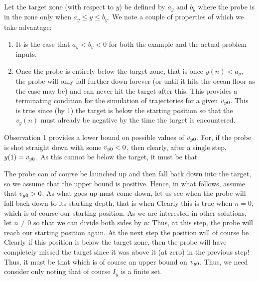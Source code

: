 \documentclass{article}
\begin{document}
{    Let the target zone (with respect to $y$) be defined by $a_y$ and $b_y$ where the probe is in the zone only when $a_y \leq y \leq b_y$.
    We note a couple of properties of which we take advantage:
    \begin{enumerate}
        \item It is the case that $a_y < b_y < 0$ for both the example and the actual problem inputs.
        \item Once the probe is entirely below the target zone, that is once $y(n) < a_y$, the probe will only fall further down forever (or until it hits the ocean floor as the case may be) and can never hit the target after this.
              This provides a terminating condition for the simulation of trajectories for a given $v_{y0}$.
              This is true since (by 1) the target is below the starting position so that the $v_y(n)$ must already be negative by the time the target is encountered.
    \end{enumerate}
    Observation 1 provides a lower bound on possible values of $v_{y0}$.
    For, if the probe is shot straight down with some $v_{y0} < 0$, then clearly, after a single step, $y(1) = v_{y0}$.
    As this cannot be below the target, it must be that

    The probe can of course be launched up and then fall back down into the target, so we assume that the upper bound is positive.
    Hence, in what follows, assume that $v_{y0} > 0$.
    As what goes up must come down, let us see when the probe will fall back down to its starting depth, that is when
    Clearly this is true when $n = 0$, which is of course our starting position.
    As we are interested in other solutions, let $n \neq 0$ so that we can divide both sides by $n$:
    Thus, at this step, the probe will reach our starting position again.
    At the next step the position will of course be
    Clearly if this position is below the target zone, then the probe will have completely missed the target since it was above it (at zero) in the previous step!
    Thus, it must be that
    which is of course an upper bound on $v_{y0}$.
    Thus, we need consider only
    noting that of course $I_y$ is a finite set.

}
\end{document}
